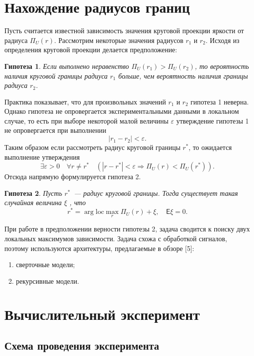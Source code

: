 \documentclass[12pt, twoside]{article}
\newtheorem{hop}{Гипотеза}
\begin{document}
\section{Нахождение радиусов границ}

Пусть считается известной зависимость значения круговой проекции яркости от радиуса $\Pi_U(r)$. Рассмотрим некоторые значения радиусов $r_1$ и $r_2$. Исходя из определения круговой проекции делается предположение:
\begin{hop}
Если выполнено неравенство $\Pi_U(r_1) > \Pi_U(r_2)$, то вероятность наличия круговой границы радиуса $r_1$ больше, чем вероятность наличия границы радиуса $r_2$.
\end{hop}

Практика показывает, что для произвольных значений $r_1$ и $r_2$ гипотеза 1 неверна. Однако гипотеза не опровергается экспериментальными данными в локальном случае, то есть при выборе некоторой малой величины $\varepsilon$ утверждение гипотезы 1 не опровергается при выполнении
\[
|r_1-r_2| < \varepsilon.
\]
Таким образом если рассмотреть радиус круговой границы $r^*$, то ожидается выполнение утверждения
\[
\exists \varepsilon > 0 \quad \forall r \neq r^* \quad \left(|r-r^*| < \varepsilon \Longrightarrow \Pi_U(r) < \Pi_U(r^*)\right).
\]
Отсюда напрямую формулируется гипотеза 2.

\begin{hop}
Пусть $r^*$~--- радиус круговой границы. Тогда существует такая случайная величина $\xi$ , что
\[
 r^* = \arg \text{loc}\max\limits_{r}\Pi_U(r) + \xi, \quad \mathsf{E}\xi=0.
\]
\end{hop}

При работе в предположении верности гипотезы 2, задача сводится к поиску двух локальных максимумов зависимости. Задача схожа с обработкой сигналов, поэтому используются архитектуры, предлагаемые в обзоре [5]:
\begin{enumerate}
	\item сверточные модели;
	\item рекурсивные модели.
\end{enumerate}


\section{Вычислительный эксперимент}

\subsection{Схема проведения эксперимента}
\end{document}
